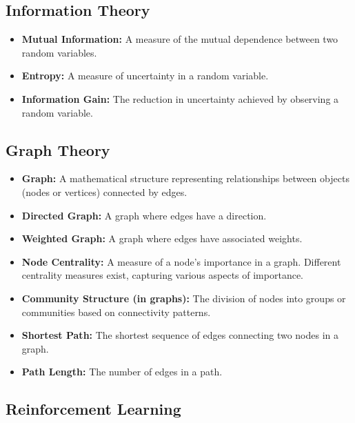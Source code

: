 \documentclass{article}
\begin{document}
\subsection{Information Theory}

\begin{itemize}
    \item \textbf{Mutual Information:}  A measure of the mutual dependence between two random variables.
    \item \textbf{Entropy:} A measure of uncertainty in a random variable.
    \item \textbf{Information Gain:}  The reduction in uncertainty achieved by observing a random variable.
\end{itemize}


\subsection{Graph Theory}

\begin{itemize}
    \item \textbf{Graph:} A mathematical structure representing relationships between objects (nodes or vertices) connected by edges.
    \item \textbf{Directed Graph:} A graph where edges have a direction.
    \item \textbf{Weighted Graph:} A graph where edges have associated weights.
    \item \textbf{Node Centrality:}  A measure of a node's importance in a graph.  Different centrality measures exist, capturing various aspects of importance.
    \item \textbf{Community Structure (in graphs): } The division of nodes into groups or communities based on connectivity patterns.
    \item \textbf{Shortest Path:} The shortest sequence of edges connecting two nodes in a graph.
    \item \textbf{Path Length:} The number of edges in a path.
\end{itemize}


\subsection{Reinforcement Learning}
\end{document}
